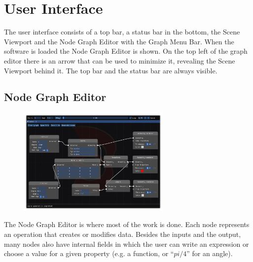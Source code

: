 \chapter{User Interface}

The user interface consists of a top bar, a status bar in the bottom,
the Scene Viewport and the Node Graph Editor with the Graph Menu Bar.
When the software is loaded the Node Graph Editor is shown. On the top left
of the graph editor there is an arrow that can be used to minimize it,
revealing the Scene Viewport behind it. The top bar and the status bar are
always visible.

\section{Node Graph Editor}
\begin{figure}[H]
\centering
\includegraphics[width=0.666\textwidth]{figures/graph_editor.png}
\end{figure}
The Node Graph Editor is where most of the work is done.
Each node represents an operation that creates or modifies data. Besides the inputs and
the output, many nodes also have internal fields in which the user can write an expression
or choose a value for a given property (e.g. a function, or ``$pi/4$'' for an angle).

